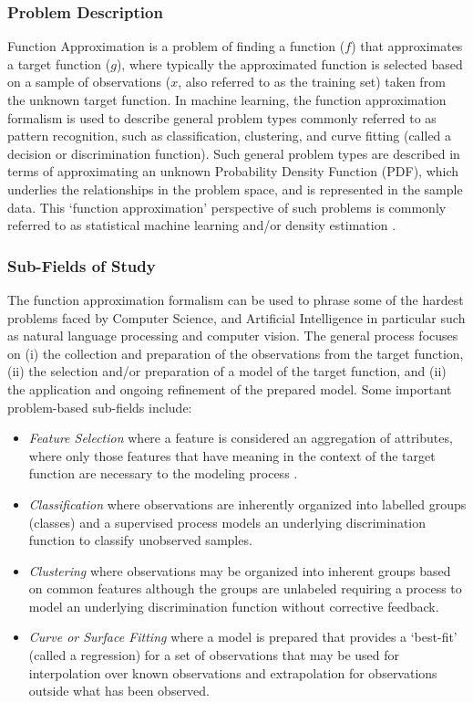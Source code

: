 \subsubsection{Problem Description}
Function Approximation is a problem of finding a function ($f$) that approximates a target function ($g$), where typically the approximated function is selected based on a sample of observations ($x$, also referred to as the training set) taken from the unknown target function.
In machine learning, the function approximation formalism is used to describe general problem types commonly referred to as pattern recognition, such as classification, clustering, and curve fitting (called a decision or discrimination function). Such general problem types are described in terms of approximating an unknown Probability Density Function (PDF), which underlies the relationships in the problem space, and is represented in the sample data. This `function approximation' perspective of such problems is commonly referred to as statistical machine learning and/or density estimation \cite{Fukunaga1990, Bishop1995}.

%
%
\subsubsection{Sub-Fields of Study}
The function approximation formalism can be used to phrase some of the hardest problems faced by Computer Science, and Artificial Intelligence in particular such as natural language processing and computer vision. 
The general process focuses on (i) the collection and preparation of the observations from the target function, (ii) the selection and/or preparation of a model of the target function, and (ii) the application and ongoing refinement of the prepared model. 
Some important problem-based sub-fields include: 
\begin{itemize}
	\item \emph{Feature Selection} where a feature is considered an aggregation of attributes, where only those features that have meaning in the context of the target function are necessary to the modeling process \cite{Kudo2000, Guyon2003}.
	\item \emph{Classification} where observations are inherently organized into labelled groups (classes) and a supervised process models an underlying discrimination function to classify unobserved samples.
	\item \emph{Clustering} where observations may be organized into inherent groups based on common features although the groups are unlabeled requiring a process to model an underlying discrimination function without corrective feedback.
	\item \emph{Curve or Surface Fitting} where a model is prepared that provides a `best-fit' (called a regression) for a set of observations that may be used for interpolation over known observations and extrapolation for observations outside what has been observed.
\end{itemize}

